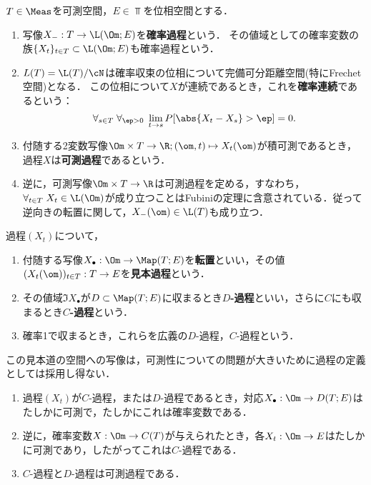 \documentclass[uplatex,dvipdfmx]{jsreport}
\begin{document}
\begin{definition}
    $T\in\Meas$を可測空間，$E\in\Top$を位相空間とする．
    \begin{enumerate}
        \item 写像$X_-:T\to \L(\Om;E)$を\textbf{確率過程}という．
        その値域としての確率変数の族$\{X_t\}_{t\in T}\subset \L(\Om;E)$も確率過程という．
        \item $L(T)=\L(T)/\cN$は確率収束の位相について完備可分距離空間(特にFrechet空間)となる．
        この位相について$X$が連続であるとき，これを\textbf{確率連続}であるという：
        \[\forall_{s\in T}\;\forall_{\ep>0}\;\lim_{t\to s}P[\abs{X_t-X_s}>\ep]=0.\]
        \item 付随する2変数写像$\Om\times T\to\R;(\om,t)\mapsto X_t(\om)$が積可測であるとき，過程$X$は\textbf{可測過程}であるという．
        \item 逆に，可測写像$\Om\times T\to\R$は可測過程を定める，すなわち，$\forall_{t\in T}\;X_t\in \L(\Om)$が成り立つことはFubiniの定理に含意されている．従って逆向きの転置に関して，$X_-(\om)\in\L(T)$も成り立つ．
    \end{enumerate}
\end{definition}

\begin{definition}
    過程$(X_t)$について，
    \begin{enumerate}
        \item 付随する写像$X_\bullet:\Om\to \Map(T;E)$を\textbf{転置}といい，その値$(X_t(\om))_{t\in T}:T\to E$を\textbf{見本過程}という．
        \item その値域$\Im X_\bullet$が$D\subset\Map(T;E)$に収まるとき\textbf{$D$-過程}といい，さらに$C$にも収まるとき\textbf{$C$-過程}という．
        \item 確率1で収まるとき，これらを広義の$D$-過程，$C$-過程という．
    \end{enumerate}
\end{definition}
\begin{remarks}
    この見本道の空間への写像は，可測性についての問題が大きいために過程の定義としては採用し得ない．
\end{remarks}

\begin{theorem}\mbox{}
    \begin{enumerate}
        \item 過程$(X_t)$が$C$-過程，または$D$-過程であるとき，対応$X_\bullet:\Om\to D(T;E)$はたしかに可測で，たしかにこれは確率変数である．
        \item 逆に，確率変数$X:\Om\to C(T)$が与えられたとき，各$X_t:\Om\to E$はたしかに可測であり，したがってこれは$C$-過程である．
        \item $C$-過程と$D$-過程は可測過程である．
    \end{enumerate}
\end{theorem}
\end{document}
